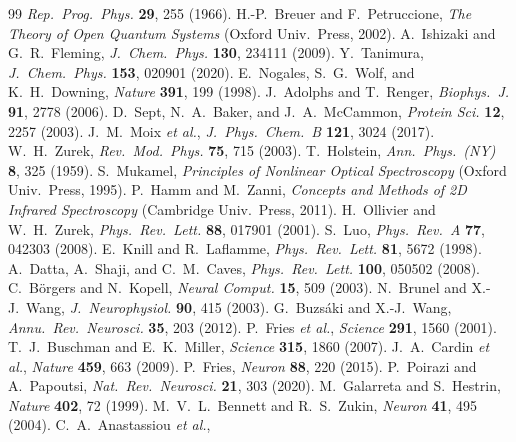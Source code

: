 \documentclass[twocolumn,10pt]{article}
\begin{document}
\begin{thebibliography}{99}
\textit{Rep.\ Prog.\ Phys.} \textbf{29}, 255 (1966).
 H.-P.~Breuer and F.~Petruccione,
\textit{The Theory of Open Quantum Systems} (Oxford Univ.\ Press, 2002).
 A.~Ishizaki and G.~R.~Fleming,
\textit{J.\ Chem.\ Phys.} \textbf{130}, 234111 (2009).
 Y.~Tanimura,
\textit{J.\ Chem.\ Phys.} \textbf{153}, 020901 (2020).
 E.~Nogales, S.~G.~Wolf, and K.~H.~Downing,
\textit{Nature} \textbf{391}, 199 (1998).
 J.~Adolphs and T.~Renger,
\textit{Biophys.\ J.} \textbf{91}, 2778 (2006).
 D.~Sept, N.~A.~Baker, and J.~A.~McCammon,
\textit{Protein Sci.} \textbf{12}, 2257 (2003).
 J.~M.~Moix \textit{et al.},
\textit{J.\ Phys.\ Chem.\ B} \textbf{121}, 3024 (2017).
 W.~H.~Zurek,
\textit{Rev.\ Mod.\ Phys.} \textbf{75}, 715 (2003).
 T.~Holstein,
\textit{Ann.\ Phys.\ (NY)} \textbf{8}, 325 (1959).
 S.~Mukamel, \textit{Principles of Nonlinear Optical
Spectroscopy} (Oxford Univ.\ Press, 1995).
 P.~Hamm and M.~Zanni, \textit{Concepts and Methods of
2D Infrared Spectroscopy} (Cambridge Univ.\ Press, 2011).
 H.~Ollivier and W.~H.~Zurek,
\textit{Phys.\ Rev.\ Lett.} \textbf{88}, 017901 (2001).
 S.~Luo,
\textit{Phys.\ Rev.\ A} \textbf{77}, 042303 (2008).
 E.~Knill and R.~Laflamme,
\textit{Phys.\ Rev.\ Lett.} \textbf{81}, 5672 (1998).
 A.~Datta, A.~Shaji, and C.~M.~Caves,
\textit{Phys.\ Rev.\ Lett.} \textbf{100}, 050502 (2008).
 C.~B\"orgers and N.~Kopell,
\textit{Neural Comput.} \textbf{15}, 509 (2003).
 N.~Brunel and X.-J.~Wang,
\textit{J.\ Neurophysiol.} \textbf{90}, 415 (2003).
 G.~Buzs\'aki and X.-J.~Wang,
\textit{Annu.\ Rev.\ Neurosci.} \textbf{35}, 203 (2012).
 P.~Fries \textit{et al.},
\textit{Science} \textbf{291}, 1560 (2001).
 T.~J.~Buschman and E.~K.~Miller,
\textit{Science} \textbf{315}, 1860 (2007).
 J.~A.~Cardin \textit{et al.},
\textit{Nature} \textbf{459}, 663 (2009).
 P.~Fries,
\textit{Neuron} \textbf{88}, 220 (2015).
 P.~Poirazi and A.~Papoutsi,
\textit{Nat.\ Rev.\ Neurosci.} \textbf{21}, 303 (2020).
 M.~Galarreta and S.~Hestrin,
\textit{Nature} \textbf{402}, 72 (1999).
 M.~V.~L.~Bennett and R.~S.~Zukin,
\textit{Neuron} \textbf{41}, 495 (2004).
 C.~A.~Anastassiou \textit{et al.},

\end{thebibliography}
\end{document}
